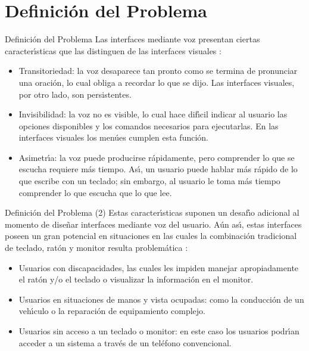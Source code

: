 \section{Definici\'on del Problema}

\begin{frame}{Definici\'on del Problema}
Las interfaces mediante voz presentan ciertas caracter{\'\i}sticas que las
distinguen de las interfaces visuales \cite{GabrielVoice2007}:

\begin{itemize}
    \item Transitoriedad: la voz desaparece tan pronto como se termina de pronunciar una oraci\'on,
    lo cual obliga a recordar lo que se dijo. Las interfaces visuales, por otro lado, son persistentes.
    \item Invisibilidad: la voz no es visible, lo cual hace dif{\'\i}cil indicar al usuario las opciones
    disponibles y los comandos necesarios para ejecutarlas. En las interfaces visuales los men\'ues
    cumplen esta funci\'on.
    \item Asimetr{\'\i}a: la voz puede producirse r\'apidamente, pero comprender lo que se escucha requiere
    m\'as tiempo. As{\'\i}, un usuario puede hablar m\'as r\'apido de lo que escribe con un teclado; sin embargo,
    al usuario le toma m\'as tiempo comprender lo que escucha que lo que lee.
\end{itemize}
\end{frame}

\begin{frame}{Definici\'on del Problema (2)}
Estas caracter{\'\i}sticas suponen un desaf{\'\i}o adicional al momento de dise\~nar interfaces mediante voz del
usuario. A\'un as{\'\i}, estas interfaces poseen un gran potencial en situaciones en las cuales la
combinaci\'on tradicional de teclado, rat\'on y monitor resulta problem\'atica \cite{NielsenVoice2003}:

\begin{itemize}
    \item Usuarios con discapacidades, las cuales les impiden manejar apropiadamente el rat\'on y/o
    el teclado o visualizar la informaci\'on en el monitor.
    \item Usuarios en situaciones de manos y vista ocupadas: como la conducci\'on de un veh{\'\i}culo o
    la reparaci\'on de equipamiento complejo.
    \item Usuarios sin acceso a un teclado o monitor: en este caso los usuarios podr{\'\i}an acceder
    a un sistema a trav\'es de un tel\'efono convencional.
\end{itemize}

\end{frame}

